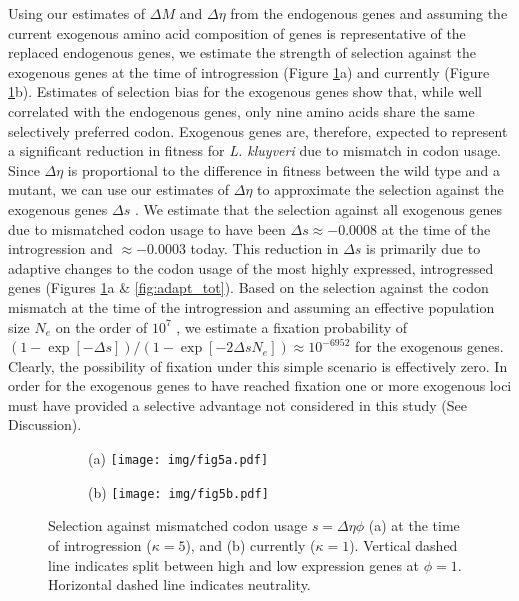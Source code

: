 \documentclass[doublespacing,linenumbers]{bmcart-modified}
\newcommand{\kluyveri}{\textit{L. kluyveri}\xspace}
\newcommand{\DE}{\ensuremath{{\Delta \eta}}\xspace}
\newcommand{\Ne}{\ensuremath{N_e}\xspace}
\newcommand{\GL}{\ensuremath{{\Delta s}}\xspace}
\begin{document}
Using our estimates of $\Delta M$ and $\Delta \eta$ from the endogenous genes and assuming the current exogenous amino acid composition of genes is representative of the replaced endogenous genes, we estimate the strength of selection against the exogenous genes at the time of introgression (Figure \ref{fig:sne_fitness_burden}a) and currently (Figure \ref{fig:sne_fitness_burden}b).
Estimates of selection bias for the exogenous genes show that, while well correlated with the endogenous genes, only nine amino acids share the same selectively preferred codon.
Exogenous genes are, therefore, expected to represent a significant reduction in fitness for \kluyveri due to mismatch in codon usage.
Since \DE is proportional to the difference in fitness between the wild type and a mutant, we can use our estimates of \DE to approximate the selection against the exogenous genes $\GL$ \citep{SellaAndHirsh2005,gilchrist2015}. 
We estimate that the selection against all exogenous genes due to mismatched codon usage to have been $\GL \approx -0.0008$ at the time of the introgression and $\approx -0.0003$ today.
This reduction in $\GL$ is primarily due to adaptive changes to the codon usage of the most highly expressed, introgressed genes (Figures \ref{fig:sne_fitness_burden}a \& \ref{fig:adapt_tot}).
Based on the selection against the codon mismatch at the time of the introgression and assuming an effective population size $\Ne$ on the order of $10^7$ \citep{wagner2005}, we estimate a fixation probability of $(1-\exp[-\GL])/(1-\exp[-2\GL \Ne]) \approx 10^{-6952}$ \citep{SellaAndHirsh2005} for the exogenous genes.
Clearly, the possibility of fixation under this simple scenario is effectively zero.
In order for the exogenous genes to have reached fixation one or more exogenous loci must have provided a selective advantage not considered in this study (See Discussion).

\begin{figure}
    \centering
    \begin{subfigure}
        \centering
        (a) \texttt{[image: img/fig5a.pdf]}%
    \end{subfigure}
    \begin{subfigure}
        \centering
        (b) \texttt{[image: img/fig5b.pdf]}%
    \end{subfigure}
    \caption{Selection against mismatched codon usage $s = \DE \phi$ (a) at the time of introgression ($\kappa = 5$), and (b) currently ($\kappa = 1$). 
        Vertical dashed line indicates split between high and low expression genes at $\phi = 1$.
    	Horizontal dashed line indicates neutrality.}
    \label{fig:sne_fitness_burden}
\end{figure}
\end{document}

